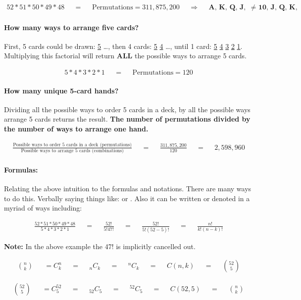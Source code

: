 \documentclass[12pt]{article}
\newcommand*{\Comb}[2]{{}^{#1}C_{#2}}%
\begin{document}
  \begin{align}
    52 * 51 * 50 * 49 * 48 && = &&
    \text{Permutations} = 311,875,200 && \Rightarrow &&
    \textbf{A, K, Q, J, 10 $\neq$ 10, J, Q, K, A}
  \end{align}


  \paragraph{How many ways to arrange five cards?}First, 5 cards could be drawn: \underline{5} \ldots, then 4 cards: \underline{5} \underline{4} \ldots, until 1 card: \underline{5} \underline{4} \underline{3} \underline{2} \underline{1}. Multiplying this factorial will return \textbf{ALL} the possible ways to arrange 5 cards.

  \begin{align}
    5 * 4 * 3 * 2 * 1 && = &&
    \text{Permutations} = 120
  \end{align}

  \paragraph{How many unique 5-card hands?} Dividing all the possible ways to order 5 cards in a deck, by all the possible ways arrange 5 cards returns the result. \textbf{The number of permutations divided by the number of ways to arrange one hand.}

  \begin{align}
    \frac{\text{Possible ways to order 5 cards in a deck (permutations)}}
    {\text{Possible ways to arrange 5 cards (combinations)}} && = &&
    \frac{311,875,200}{120} && = && 2,598,960
  \end{align}

  \paragraph{Formulas:} Relating the above intuition to the formulas and notations. There are many ways to do this. Verbally saying things like:  or . Also it can be written or denoted in a myriad of ways including:

  \begin{align}
    \frac{52 * 51 * 50 * 49 * 48}{5 * 4 * 3 * 2 * 1} && = &&
    \frac{52!}{5!47!} && = && \frac{52!}{5!(52 - 5)!} && = &&
    \frac{n!}{k!(n - k)!}
  \end{align}

  \textbf{Note:} In the above example the 47! is implicitly cancelled out.

  \begin{align}
    \binom nk && = C^{n}_{k} && = && _{n}C_{k} &&
    = && \Comb{n}{k} && = && C\left(n, k\right) && = && \binom {52}{5}
  \end{align}

  \begin{align}
    \binom {52}{5} && = C^{52}_{5} && = && _{52}C_{5} &&
    = && \Comb{52}{5} && = && C\left(52, 5\right) && = && \binom nk
  \end{align}

\end{document}
